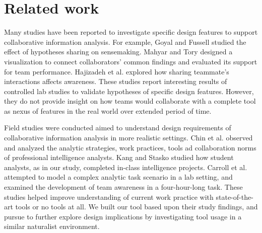 
\section{Related work}\label{related-work}

Many studies have been reported to investigate specific design features
to support collaborative information analysis. For example, Goyal and
Fussell \autocite{Goyal2016} studied the effect of hypotheses sharing on
sensemaking. Mahyar and Tory \autocite{Mahyar2013b} designed a
visualization to connect collaborators' common findings and evaluated
its support for team performance. Hajizadeh et al.
\autocite{Hajizadeh2013} explored how sharing teammate's interactions
affects awareness. These studies report interesting results of
controlled lab studies to validate hypotheses of specific design
features. However, they do not provide insight on how teams would
collaborate with a complete tool as nexus of features in the real world
over extended period of time.

Field studies were conducted aimed to understand design requirements of
collaborative information analysis in more realistic settings. Chin et
al. \autocite{Chin2009} observed and analyzed the analytic strategies,
work practices, tools ad collaboration norms of professional
intelligence analysts. Kang and Stasko \autocite{Kang2011} studied how
student analysts, as in our study, completed in-class intelligence
projects. Carroll et al. \autocite{Carroll2013} attempted to model a
complex analytic task scenario in a lab setting, and examined the
development of team awareness in a four-hour-long task. These studies
helped improve understanding of current work practice with
state-of-the-art tools or no tools at all. We built our tool based upon
their study findings, and pursue to further explore design implications
by investigating tool usage in a similar naturalist environment.

